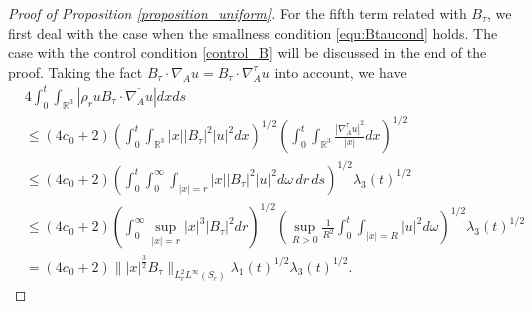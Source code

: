\documentclass[10pt%
]{amsart}
\numberwithin{equation}{section}
\newcommand{\R}{\mathbb{R}}
\theoremstyle{definition}
\begin{document}
\begin{proof}[Proof of Proposition \ref{proposition_uniform}]
	For the fifth term related with $B_\tau$, we first deal with the case when the smallness condition \eqref{equ:Btaucond} holds. The case with the control condition \eqref{control_B} will be discussed in the end of the proof. Taking the fact $B_\tau\cdot \nabla_Au=B_\tau\cdot\nabla^\tau_Au$ into account, we have
	\begin{align}
		\label{proof_energy_4}
		&4 \int_0^t\int_{\R^3}|\rho_ruB_\tau \cdot \overline{\nabla_A u}|dx ds\\\nonumber
		&\le (4c_0+2)\left(\int_0^t\int_{\R^3}|x||B_\tau|^2|u|^2dx\right)^{1/2}\left(\int_0^t\int_{\R^3}\frac{|\nabla^\tau_Au|^2}{|x|}dx\right)^{1/2}\\\nonumber
		&\le (4c_0+2)\left(\int_0^t\int_0^\infty \int_{|x|=r}|x||B_\tau|^2|u|^2d\omega\,dr\,ds\right)^{1/2}\lambda_3(t)^{1/2}\\\nonumber
		&\le (4c_0+2) \left(\int_0^\infty \sup_{|x|=r}|x|^3|B_\tau|^2 dr\right)^{1/2}\left(\sup_{R>0}\frac{1}{R^2}\int_0^t \int_{|x|=R}|u|^2d\omega\right)^{1/2}\lambda_3(t)^{1/2}\\\nonumber
		&=(4c_0+2)\||x|^{\frac32}B_\tau\|_{L^2_rL^\infty(S_r)} \lambda_1(t)^{1/2}\lambda_3(t)^{1/2}.
	\end{align}
	

\end{proof}
\end{document}
